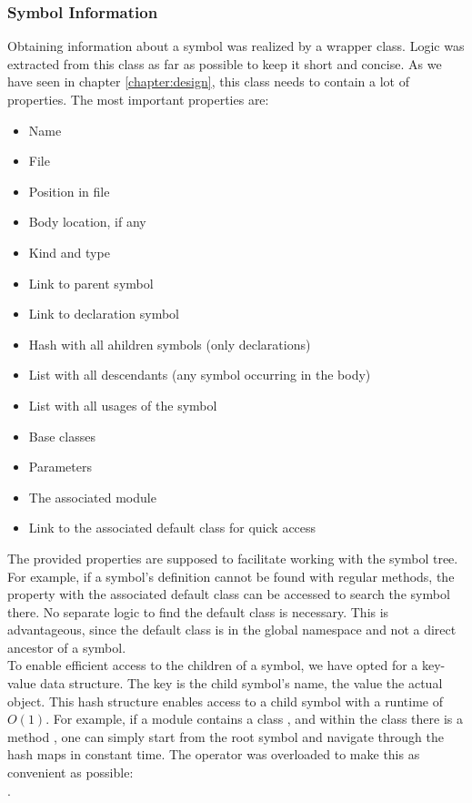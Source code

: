 \subsubsection{Symbol Information}
Obtaining information about a symbol was realized by a wrapper class.
Logic was extracted from this class as far as possible to keep it short and concise.
As we have seen in chapter \ref{chapter:design}, this class needs to contain a lot of properties.
The most important properties are:
\begin{itemize}
    \item Name
    \item File
    \item Position in file
    \item Body location, if any
    \item Kind and type
    \item Link to parent symbol
    \item Link to declaration symbol
    \item Hash with all ahildren symbols (only declarations)
    \item List with all descendants (any symbol occurring in the body)
    \item List with all usages of the symbol
    \item Base classes
    \item Parameters
    \item The associated module
    \item Link to the associated default class for quick access
\end{itemize}

The provided properties are supposed to facilitate working with the symbol tree.
For example, if a symbol's definition cannot be found with regular methods,
the property with the associated default class can be accessed to search the symbol there.
No separate logic to find the default class is necessary.
This is advantageous, since the default class is in the global namespace and not a direct ancestor of a symbol.\\

To enable efficient access to the children of a symbol, we have opted for a key-value data structure.
The key is the child symbol's name, the value the actual  object.
This hash structure enables access to a child symbol with a runtime of $O(1)$.
For example, if a module  contains a class , and within the class there is a method ,
one can simply start from the root symbol and navigate through the hash maps in constant time.
The \code{[]} operator was overloaded to make this as convenient as possible:\\
.\\

